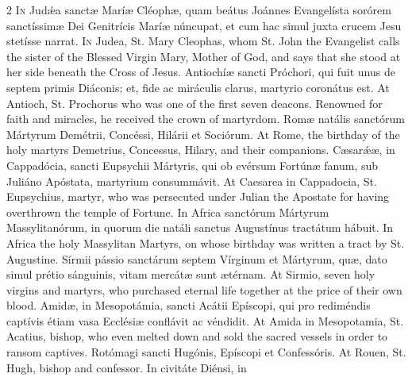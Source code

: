 \begin{paracol}{2}
\lettrine[lines=2]{I}{n} Judǽa sanctæ Maríæ 
 Cléophæ, quam beátus Joánnes Evangelísta sorórem sanctíssimæ Dei Genitrícis 
 Maríæ núncupat, et cum hac simul juxta crucem Jesu stetísse narrat.
\switchcolumn
{}
\lettrine[lines=2]{I}{n} Judea, St. Mary Cleophas, whom 
 St. John the Evangelist calls the sister of the Blessed Virgin Mary, Mother 
 of God, and says that she stood at her side beneath the Cross of Jesus.
\switchcolumn*
{}
Antiochíæ sancti 
 Próchori, qui fuit unus de septem primis Diáconis; et, fide ac miráculis 
 clarus, martyrio coronátus est.
\switchcolumn
{}
At Antioch, St. Prochorus who was 
 one of the first seven deacons. Renowned for faith and miracles, he 
 received the crown of martyrdom.
\switchcolumn*
{}
Romæ natális sanctórum 
 Mártyrum Demétrii, Concéssi, Hilárii et Sociórum.
\switchcolumn
{}
At Rome, the birthday of the holy 
 martyrs Demetrius, Concessus, Hilary, and their companions.
\switchcolumn*
{}
Cæsarǽæ, in Cappadócia, 
 sancti Eupsychii Mártyris, qui ob evérsum Fortúnæ fanum, sub Juliáno 
 Apóstata, martyrium consummávit.
\switchcolumn
{}
At Caesarea in Cappadocia, St. 
 Eupsychius, martyr, who was persecuted under Julian the Apostate for having 
 overthrown the temple of Fortune.
\switchcolumn*
{}
In Africa sanctórum 
 Mártyrum Massylitanórum, in quorum die natáli sanctus Augustínus tractátum 
 hábuit.
\switchcolumn
{}
In Africa the holy Massylitan 
 Martyrs, on whose birthday was written a tract by St. Augustine.
\switchcolumn*
{}
Sírmii pássio 
 sanctárum septem Vírginum et Mártyrum, quæ, dato simul prétio sánguinis, 
 vitam mercátæ sunt ætérnam.
\switchcolumn
{}
At Sirmio, seven holy virgins and 
 martyrs, who purchased eternal life together at the price of their own 
 blood.
\switchcolumn*
{}
Amidæ, in Mesopotámia, sancti Acátii Epíscopi, qui pro rediméndis captívis étiam vasa Ecclésiæ 
 conflávit ac véndidit.
\switchcolumn
{}
At Amida in Mesopotamia, St. 
 Acatius, bishop, who even melted down and sold the sacred vessels in order 
 to ransom captives.
\switchcolumn*
{}
Rotómagi sancti 
 Hugónis, Epíscopi et Confessóris.
\switchcolumn
{}
At Rouen, St. Hugh, bishop and 
 confessor.
\switchcolumn*
{}
In civitáte Diénsi, in 

\end{paracol}
